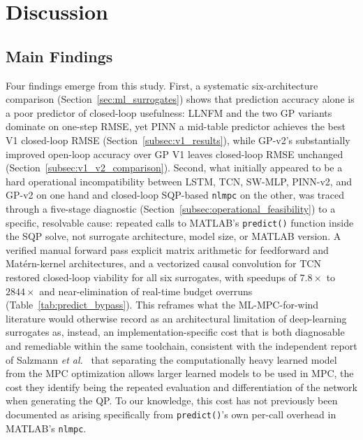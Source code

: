 
\section{Discussion}
\label{sec:discussion}

\subsection{Main Findings}
\label{subsec:main_findings}

Four findings emerge from this study. First, a systematic six-architecture
comparison (Section~\ref{sec:ml_surrogates}) shows that prediction accuracy
alone is a poor predictor of closed-loop usefulness: LLNFM and the two GP
variants dominate on one-step RMSE, yet PINN a mid-table predictor
achieves the best V1 closed-loop RMSE (Section~\ref{subsec:v1_results}),
while GP-v2's substantially improved open-loop accuracy over GP V1 leaves
closed-loop RMSE unchanged (Section~\ref{subsec:v1_v2_comparison}). Second,
what initially appeared to be a hard operational incompatibility between
LSTM, TCN, SW-MLP, PINN-v2, and GP-v2 on one hand and closed-loop
SQP-based \texttt{nlmpc} on the other, was traced through a five-stage
diagnostic (Section~\ref{subsec:operational_feasibility}) to a specific,
resolvable cause: repeated calls to MATLAB's \texttt{predict()} function
inside the SQP solve, not surrogate architecture, model size, or MATLAB
version. A verified manual forward pass  explicit matrix arithmetic
for feedforward and Mat\'ern-kernel architectures, and a vectorized
causal convolution for TCN  restored closed-loop viability for all
six surrogates, with speedups of $7.8\times$ to $2844\times$ and
near-elimination of real-time budget overruns
(Table~\ref{tab:predict_bypass}). This reframes what the ML-MPC-for-wind
literature would otherwise record as an architectural limitation of
deep-learning surrogates as, instead, an implementation-specific cost
that is both diagnosable and remediable within the same toolchain,
{\color{auditP2}consistent with the independent report of Salzmann \emph{et al.}~\cite{salzmann_real-time_2022}
that separating the computationally heavy learned model from the MPC
optimization allows larger learned models to be used in MPC, the cost
they identify being the repeated evaluation and differentiation of the
network when generating the QP. To our knowledge, this cost has not
previously been documented as arising specifically from
\texttt{predict()}'s own per-call overhead in MATLAB's \texttt{nlmpc}.}
